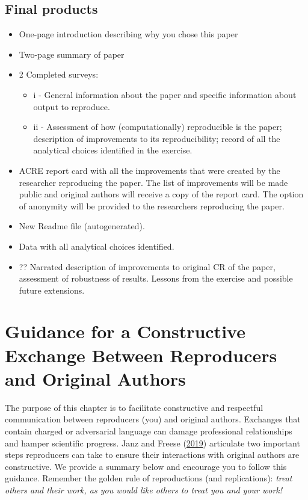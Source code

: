 \documentclass[]{book}
\providecommand{\tightlist}{%
  \setlength{\itemsep}{0pt}\setlength{\parskip}{0pt}}
\begin{document}
\hypertarget{final-products}{%
\section{Final products}\label{final-products}}

\begin{itemize}
\item
  One-page introduction describing why you chose this paper
\item
  Two-page summary of paper
\item
  2 Completed surveys:

  \begin{itemize}
  \tightlist
  \item
    i - General information about the paper and specific
    information about output to reproduce.\\
  \item
    ii - Assessment of how (computationally) reproducible is the paper;
    description of improvements to its reproducibility; record of all the
    analytical choices identified in the exercise.
  \end{itemize}
\item
  ACRE report card with all the improvements that were created by the researcher reproducing the paper. The list of improvements will be made public and original authors will receive a copy of the report card. The option of anonymity will be provided to the researchers reproducing the paper.
\item
  New Readme file (autogenerated).
\item
  Data with all analytical choices identified.
\item
  ?? Narrated description of improvements to original CR of the paper, assessment of robustness of results. Lessons from the exercise and possible future extensions.
\end{itemize}

\hypertarget{guidance-for-a-constructive-exchange-between-reproducers-and-original-authors}{%
\chapter{Guidance for a Constructive Exchange Between Reproducers and Original Authors}\label{guidance-for-a-constructive-exchange-between-reproducers-and-original-authors}}

The purpose of this chapter is to facilitate constructive and respectful communication between reproducers (you) and original authors. Exchanges that contain charged or adversarial language can damage professional relationships and hamper scientific progress. Janz and Freese (\href{https://www.mzes.uni-mannheim.de/openscience/wp-content/uploads/2019/01/Janz-Freese_-Good-and-Bad-Replications-1.pdf}{2019}) articulate two important steps reproducers can take to ensure their interactions with original authors are constructive. We provide a summary below and encourage you to follow this guidance. Remember the golden rule of reproductions (and replications): \emph{treat others and their work, as you would like others to treat you and your work!}
\end{document}

